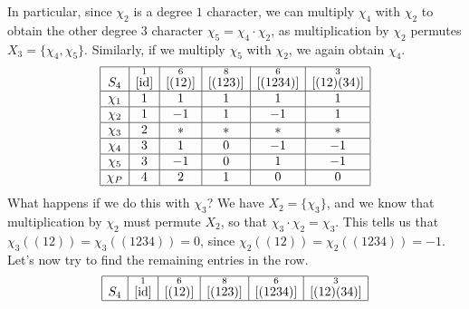 \begin{exmp}{}
    In particular, since $\chi_2$ is a degree $1$ character, we can multiply 
    $\chi_4$ with $\chi_2$ to obtain the other degree $3$ character 
    $\chi_5 = \chi_4 \cdot \chi_2$, as multiplication by $\chi_2$ permutes 
    $X_3 = \{\chi_4, \chi_5\}$. Similarly, if we multiply $\chi_5$ with 
    $\chi_2$, we again obtain $\chi_4$. 
    \begin{align*}
        \begin{array}{|c|c|c|c|c|c|}
            \hline
            S_4    & \overset{1}{[\operatorname{id}]} & \overset{6}{[(12)]} & \overset{8}{[(123)]} & \overset{6}{[(1234)]} & \overset{3}{[(12)(34)]} \\ \hline
            \chi_1 & 1                  & 1                   & 1                    & 1                     & 1                       \\ \hline
            \chi_2 & 1                  & -1                  & 1                    & -1                    & 1                       \\ \hline
            \chi_3 & 2                  & *                   & *                    & *                     & *                       \\ \hline
            \chi_4 & 3                  & 1                   & 0                    & -1                    & -1                      \\ \hline
            \chi_5 & 3                  & -1                  & 0                    & 1                     & -1                      \\ \hline
            \chi_P & 4                  & 2                   & 1                    & 0                     & 0                       \\ \hline 
        \end{array} 
    \end{align*}
    What happens if we do this with $\chi_3$? We have $X_2 = \{\chi_3\}$, 
    and we know that multiplication by $\chi_2$ must permute $X_2$, so that 
    $\chi_3 \cdot \chi_2 = \chi_3$. This tells us that 
    $\chi_3((12)) = \chi_3((1234)) = 0$, since $\chi_2((12)) = \chi_2((1234)) 
    = -1$. Let's now try to find the remaining entries in the row. 
    \begin{align*}
        \begin{array}{|c|c|c|c|c|c|}
            \hline
            S_4    & \overset{1}{[\operatorname{id}]} & \overset{6}{[(12)]} & \overset{8}{[(123)]} & \overset{6}{[(1234)]} & \overset{3}{[(12)(34)]} \\ \hline

\end{array}
\end{align*}
\end{exmp}
